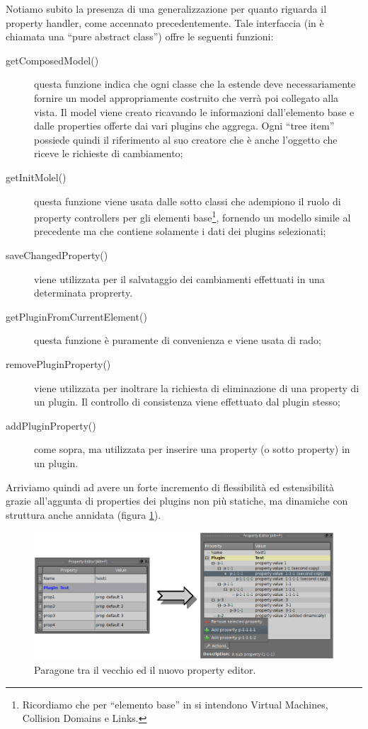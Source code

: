 Notiamo subito la presenza di una generalizzazione per quanto riguarda il property handler, come accennato precedentemente. Tale interfaccia (in \cpp{} è chiamata una ``pure abstract class'') offre le seguenti funzioni:
\begin{description}
\item[getComposedModel()]questa funzione indica che ogni classe che la estende deve necessariamente fornire un model appropriamente costruito che verrà poi collegato alla vista. Il model viene creato ricavando le informazioni dall'elemento base e dalle properties offerte dai vari plugins che aggrega. Ogni ``tree item'' possiede quindi il riferimento al suo creatore che è anche l'oggetto che riceve le richieste di cambiamento;

\item[getInitMolel()]questa funzione viene usata dalle sotto classi che adempiono il ruolo di property controllers per gli elementi base\footnote{Ricordiamo che per ``elemento base'' in \visualnetkit{} si intendono Virtual Machines, Collision Domains e Links.}, fornendo un modello simile al precedente ma che contiene solamente i dati dei plugins selezionati;

\item[saveChangedProperty()]viene utilizzata per il salvataggio dei cambiamenti effettuati in una determinata proprerty.

\item[getPluginFromCurrentElement()]questa funzione è puramente di convenienza e viene usata di rado;

\item[removePluginProperty()]viene utilizzata per inoltrare la richiesta di eliminazione di una property di un plugin. Il controllo di consistenza viene effettuato dal plugin stesso;

\item[addPluginProperty()]come sopra, ma utilizzata per inserire una property (o sotto property) in un plugin.
\end{description}

Arriviamo quindi ad avere un forte incremento di flessibilità ed estensibilità grazie all'aggunta di properties dei plugins non più statiche, ma dinamiche con struttura anche annidata (figura \ref{figura:property_editor_paragone}).

\begin{figure}[!htb]
	\centering
	\includegraphics[width=12cm]{images/property_editors_paragone.png}
	\caption{Paragone tra il vecchio ed il nuovo property editor.}
	\label{figura:property_editor_paragone}
\end{figure}


